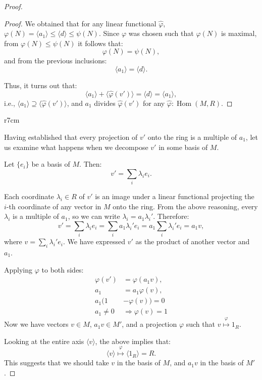 \documentclass{article}
\newif\ifusemulticols
\newif\ifmobileview
\theoremstyle{definition}
\theoremstyle{remark}
\theoremstyle{plain}
\theoremstyle{plain}
\newenvironment{mymulticols}
    { \ifusemulticols \begin{multicols}{2} \fi }
    { \ifusemulticols \end{multicols} \fi }
\newcommand\mywrapbegin[3]{\ifmobileview\else\begin{wrapfigure}[#1]{#2}{#3}\fi}
\newcommand\mywrapend{\ifmobileview\else\end{wrapfigure}\fi}
\newcommand\myminipageend{\ifmobileview\else\end{minipage}\fi}
\DeclareMathOperator{\Hom}{Hom}
\begin{document}
\begin{mymulticols}
\begin{proof}
\begin{proof}
        We obtained that for any linear functional 
        $\widehat \varphi$, $\varphi(N) = \langle a_1 \rangle \le \langle d \rangle \le \psi(N)$. 
        Since $\varphi$ was chosen such that $\varphi(N)$ is maximal,
        from $\varphi(N) \le \psi(N)$ it follows that: $$\varphi(N) = \psi(N),$$
        and from the previous inclusions: $$\langle a_1 \rangle = \langle d \rangle.$$

        Thus, it turns out that:
        $$\langle a_1 \rangle + \langle \widehat{\varphi}(v') \rangle = \langle d \rangle = \langle a_1 \rangle,$$
        i.e., $\langle a_1 \rangle \supseteq \langle \widehat{\varphi}(v') \rangle$, and $a_1$ divides $\widehat{\varphi}(v')$ for any $\widehat{\varphi} : \Hom(M, R)$.
    \end{proof}


    \mywrapbegin{11}{r}{7cm}
    \mywrapend

    Having established that every projection of $v'$ onto the ring is a multiple of $a_1$, let us
    examine what happens when we decompose $v'$ in some basis of $M$.

    Let $\{ e_i \}$ be a basis of $M$. Then: $$v' = \sum_i \lambda_i e_i.$$

    Each coordinate $\lambda_i \in R$ of $v'$ is an image under a linear functional projecting the
    $i$-th coordinate of any vector in $M$ onto the ring.
    From the above reasoning, every $\lambda_i$ is a multiple of $a_1$, so we can write $\lambda_i =
    a_1 \lambda_i'$. Therefore: $$v' = \sum_i \lambda_i e_i = \sum_i a_1 \lambda_i' e_i = a_1 \sum_i
    \lambda_i' e_i = a_1 v,$$ 
    where $v = \sum_i \lambda_i' e_i$. 
    We have expressed $v'$ as the product of another vector and $a_1$.

    Applying $\varphi$ to both sides:
    \begin{align*}
        \varphi(v') &= \varphi(a_1 v), \\
        a_1 &= a_1 \varphi(v), \\
        a_1 ( 1 &- \varphi(v) ) = 0\\
        a_1 \neq 0 &\Rightarrow \varphi(v) = 1
    \end{align*} %
    Now we have vectors $v \in M$, $a_1 v \in M'$, and a projection $\varphi$ such that $v
    \stackrel{\varphi}{\mapsto} 1_R$.

    Looking at the entire axis $\langle v \rangle$, the above implies that:
    $$\langle v \rangle \stackrel{\varphi}{\mapsto} \langle 1_R \rangle = R.$$
    This suggests that we should take $v$ in the basis of $M$, and $a_1 v$ in the basis of $M'$.


\end{proof}
\end{mymulticols}
\end{document}
